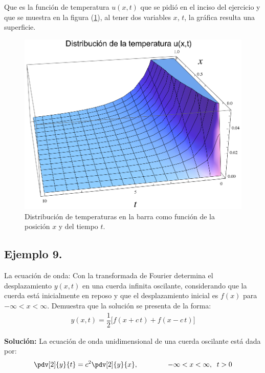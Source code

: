 Que es la función de temperatura $u (x, t)$ que se pidió en el inciso del ejercicio y que se muestra en la figura (\ref{fig:figura_plot_Ejemplo_06_02}), al tener dos variables $x$, $t$, la gráfica resulta una superficie.
\begin{figure}[H]
    \centering
    \includegraphics[scale=1]{Imagenes/Plot_Ejemplo_06_02.eps}
    \caption{Distribución de temperaturas en la barra como función de la posición $x$ y del tiempo $t$.}
    \label{fig:figura_plot_Ejemplo_06_02}
\end{figure}

\subsection*{Ejemplo 9.}

La ecuación de onda: Con la transformada de Fourier determina el desplazamiento $y(x, t)$ en una cuerda infinita oscilante, considerando que la cuerda está inicialmente en reposo y que el desplazamiento inicial es $f (x)$ para $-\infty < x < \infty$. Demuestra que la solución se presenta de la forma:
\begin{align*}
y(x, t) = \dfrac{1}{2} \big[ f(x + c \, t) + f(x - c \, t) \big]
\end{align*}
\par
\noindent
\textbf{Solución: } La ecuación de onda unidimensional de una cuerda oscilante está dada por:
\begin{align*}
\pdv[2]{y}{t} = c^{2} \pdv[2]{y}{x}, \hspace{1.5cm} -\infty < x < \infty, \hspace{0.2cm} t > 0
\end{align*}

